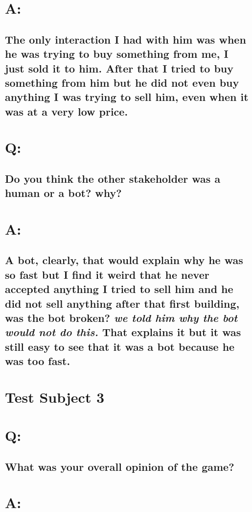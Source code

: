 \section*{A:}
\subsection*{The only interaction I had with him was when he was trying to buy something from me, I just sold it to him. After that I tried to buy something from him but he did not even buy anything I was trying to sell him, even when it was at a very low price.}

\section*{Q:}
\subsection*{Do you think the other stakeholder was a human or a bot? why?}

\section*{A:}
\subsection*{A bot, clearly, that would explain why he was so fast but I find it weird that he never accepted anything I tried to sell him and he did not sell anything after that first building, was the bot broken? \textit{we told him why the bot would not do this.} That explains it but it was still easy to see that it was a bot because he was too fast.}

\newpage

\section*{Test Subject 3}

\section*{Q:}
\subsection*{What was your overall opinion of the game?}

\section*{A:}
